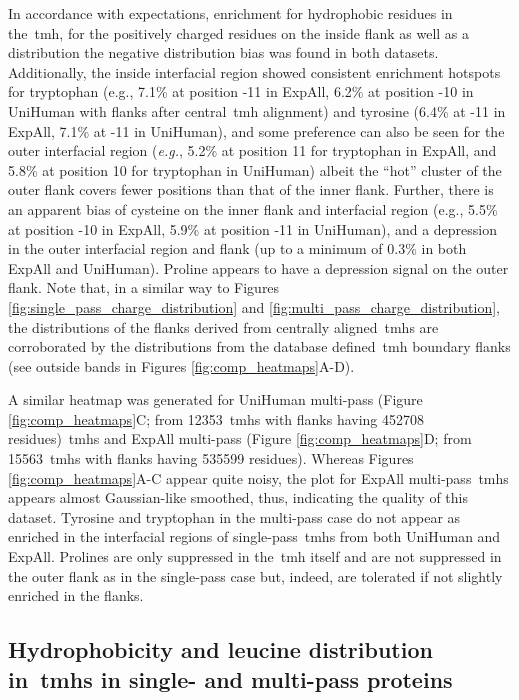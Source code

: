 In accordance with expectations, enrichment for hydrophobic residues in the~\gls{tmh}, for the positively charged residues on the inside flank as well as a distribution the negative distribution bias was found in both datasets.
Additionally, the inside interfacial region showed consistent enrichment hotspots for tryptophan (e.g., 7.1\% at position -11 in ExpAll, 6.2\% at position -10 in UniHuman with flanks after central~\gls{tmh} alignment) and tyrosine (6.4\% at -11 in ExpAll, 7.1\% at -11 in UniHuman), and some preference can also be seen for the outer interfacial region (\textit{e.g.}, 5.2\% at position 11 for tryptophan in ExpAll, and 5.8\% at position 10 for tryptophan in UniHuman) albeit the ``hot'' cluster of the outer flank covers fewer positions than that of the inner flank.
Further, there is an apparent bias of cysteine on the inner flank and interfacial region (e.g., 5.5\% at position -10 in ExpAll, 5.9\% at position -11 in UniHuman), and a depression in the outer interfacial region and flank (up to a minimum of 0.3\% in both ExpAll and UniHuman).
Proline appears to have a depression signal on the outer flank.
Note that, in a similar way to Figures \ref{fig:single_pass_charge_distribution} and \ref{fig:multi_pass_charge_distribution}, the distributions of the flanks derived from centrally aligned~\gls{tmh}s are corroborated by the distributions from the database defined~\gls{tmh} boundary flanks (see outside bands in Figures \ref{fig:comp_heatmaps}A-D).

A similar heatmap was generated for UniHuman multi-pass (Figure \ref{fig:comp_heatmaps}C; from 12353~\gls{tmh}s with flanks having 452708 residues)~\gls{tmh}s and ExpAll multi-pass (Figure \ref{fig:comp_heatmaps}D; from 15563~\gls{tmh}s with flanks having 535599 residues).
Whereas Figures \ref{fig:comp_heatmaps}A-C appear quite noisy, the plot for ExpAll multi-pass~\gls{tmh}s appears almost Gaussian-like smoothed, thus, indicating the quality of this dataset.
Tyrosine and tryptophan in the multi-pass case do not appear as enriched in the interfacial regions of single-pass~\gls{tmh}s from both UniHuman and ExpAll.
Prolines are only suppressed in the~\gls{tmh} itself and are not suppressed in the outer flank as in the single-pass case but, indeed, are tolerated if not slightly enriched in the flanks.

\subsection{Hydrophobicity and leucine distribution in~\gls{tmh}s in single- and multi-pass proteins}

